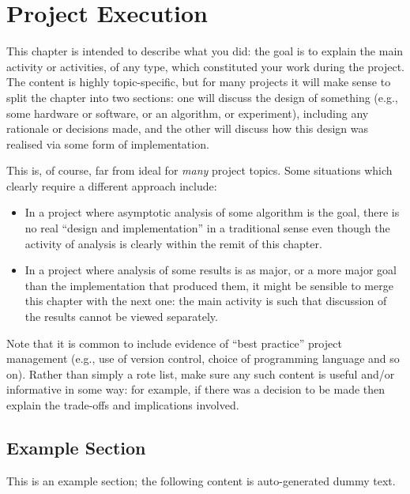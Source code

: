 \documentclass[ oneside,%
                    author={Michael Wray},
                    degree={BSc},
                     title={Some Structural Guidelines for CS Project Dissertations \\ With a Second Line Added to the Title},
                    unit={COMS30045},
                    subtitle={And Even A Fancy Subtitle}]{dissertation}
\begin{document}

\chapter{Project Execution}
\label{chap:execution}

\noindent
This chapter is intended to describe what you did: the goal is to explain
the main activity or activities, of any type, which constituted your work 
during the project.  The content is highly topic-specific, but for many 
projects it will make sense to split the chapter into two sections: one 
will discuss the design of something (e.g., some hardware or software, or 
an algorithm, or experiment), including any rationale or decisions made, 
and the other will discuss how this design was realised via some form of 
implementation.  

This is, of course, far from ideal for {\em many} project topics.  Some
situations which clearly require a different approach include:

\begin{itemize}
\item In a project where asymptotic analysis of some algorithm is the goal,
      there is no real ``design and implementation'' in a traditional sense
      even though the activity of analysis is clearly within the remit of
      this chapter.
\item In a project where analysis of some results is as major, or a more
      major goal than the implementation that produced them, it might be
      sensible to merge this chapter with the next one: the main activity 
      is such that discussion of the results cannot be viewed separately.
\end{itemize}

\noindent
Note that it is common to include evidence of ``best practice'' project 
management (e.g., use of version control, choice of programming language 
and so on).  Rather than simply a rote list, make sure any such content 
is useful and/or informative in some way: for example, if there was a 
decision to be made then explain the trade-offs and implications 
involved.

\section{Example Section}

This is an example section; 
the following content is auto-generated dummy text.
\lipsum
\end{document}
